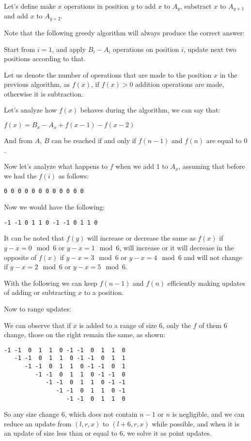 Let's define make \(x\) operations in position \(y\) to add \(x\) to
\(A_y\), substract \(x\) to \(A_{y+1}\) and add \(x\) to \(A_{y+2}\).

Note that the following greedy algorithm will always produce the correct
answer:

Start from \(i = 1\), and apply \(B_i - A_i\) operations on position
\(i\), update next two positions according to that.

Let us denote the number of operations that are made to the position
\(x\) in the previous algorithm, as \(f (x)\), if \(f (x) > 0\) addition
operations are made, otherwise it is subtraction.

Let's analyze how \(f (x)\) behaves during the algorithm, we can say
that:

\(f(x) = B_x - A_x + f(x-1) - f(x-2)\)

And from \(A\), \(B\) can be reached if and only if \(f (n-1)\) and
\(f (n)\) are equal to \(0\).

Now let's analyze what happens to \(f\) when we add \(1\) to \(A_x\),
assuming that before we had the \(f (i)\) as follows:

\begin{verbatim}
0 0 0 0 0 0 0 0 0 0 0 0
\end{verbatim}

Now we would have the following:

\begin{verbatim}
-1 -1 0 1 1 0 -1 -1 0 1 1 0
\end{verbatim}

It can be noted that \(f (y)\) will increase or decrease the same as
\(f (x)\) if \(y - x = 0 \mod {6}\) or \(y - x = 1 \mod {6}\), will
increase or it will decrease in the opposite of \(f (x)\) if
\(y - x = 3 \mod {6}\) or \(y - x = 4 \mod {6}\) and will not change if
\(y - x = 2 \mod {6}\) or \(y - x = 5 \mod {6}\).

With the following we can keep \(f (n-1)\) and \(f (n)\) efficiently
making updates of adding or subtracting \(x\) to a position.

Now to range updates:

We can observe that if \(x\) is added to a range of size \(6\), only the
\(f\) of them \(6\) change, those on the right remain the same, as
shown:

\begin{verbatim}
-1 -1  0  1  1  0 -1 -1  0  1  1  0
   -1 -1  0  1  1  0 -1 -1  0  1  1
      -1 -1  0  1  1  0 -1 -1  0  1
         -1 -1  0  1  1  0 -1 -1  0
            -1 -1  0  1  1  0 -1 -1
               -1 -1  0  1  1  0 -1
                  -1 -1  0  1  1  0
\end{verbatim}

So any size change \(6\), which does not contain \(n-1\) or \(n\) is
negligible, and we can reduce an update from \((l, r, x)\) to
\((l + 6, r, x)\) while possible, and when it is an update of size less
than or equal to \(6\), we solve it as point updates.
